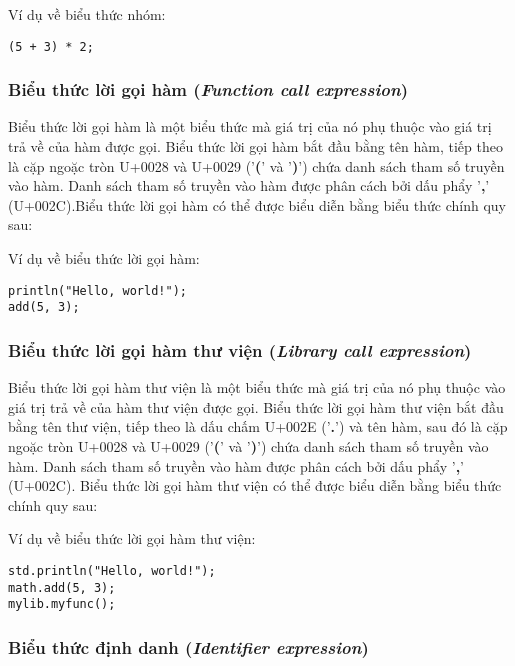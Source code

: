 \regexgroupexpr

\noindent Ví dụ về biểu thức nhóm:
\begin{lstlisting}[]
(5 + 3) * 2;
\end{lstlisting}

\subsubsection{Biểu thức lời gọi hàm (\textit{Function call expression})}

    Biểu thức lời gọi hàm là một biểu thức mà giá trị của nó phụ thuộc vào giá trị trả về của hàm được gọi. Biểu thức lời gọi hàm bắt đầu bằng tên hàm, tiếp theo là cặp ngoặc tròn U+0028 và U+0029 ('\textbf{(}' và '\textbf{)}') chứa danh sách tham số truyền vào hàm. Danh sách tham số truyền vào hàm được phân cách bởi dấu phẩy '\textbf{,}' (U+002C).Biểu thức lời gọi hàm có thể được biểu diễn bằng biểu thức chính quy sau:

\regexfuncallexpr

\noindent Ví dụ về biểu thức lời gọi hàm:
\begin{lstlisting}[]
println("Hello, world!");
add(5, 3);
\end{lstlisting}

\subsubsection{Biểu thức lời gọi hàm thư viện (\textit{Library call expression})}

Biểu thức lời gọi hàm thư viện là một biểu thức mà giá trị của nó phụ thuộc vào giá trị trả về của hàm thư viện được gọi. Biểu thức lời gọi hàm thư viện bắt đầu bằng tên thư viện, tiếp theo là dấu chấm U+002E ('\textbf{.}') và tên hàm, sau đó là cặp ngoặc tròn U+0028 và U+0029 ('\textbf{(}' và '\textbf{)}') chứa danh sách tham số truyền vào hàm. Danh sách tham số truyền vào hàm được phân cách bởi dấu phẩy '\textbf{,}' (U+002C). Biểu thức lời gọi hàm thư viện có thể được biểu diễn bằng biểu thức chính quy sau:

\regexlibfuncallexpr

\noindent Ví dụ về biểu thức lời gọi hàm thư viện:
\begin{lstlisting}[]
std.println("Hello, world!");
math.add(5, 3);
mylib.myfunc();
\end{lstlisting}

\subsubsection{Biểu thức định danh (\textit{Identifier expression})}

